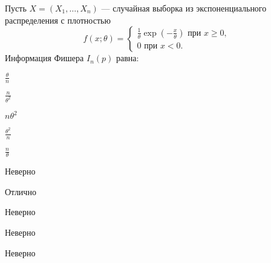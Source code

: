 
\begin{question}
Пусть \(X = (X_1, \ldots , X_n)\) — случайная выборка из
экспоненциального распределения с плотностью \[
f(x; \theta) =
\begin{cases}
\frac{1}{\theta}\exp(-\frac{x}{\theta}) \text{ при } x \geq 0,  \\
0 \text{ при } x < 0.
\end{cases}
\] Информация Фишера \(I_n(p)\) равна:
\begin{answerlist}
  \item \(\frac{\theta}{n}\)
  \item \(\frac{n}{\theta^2}\)
  \item \(n \theta^2\)
  \item \(\frac{\theta^2}{n}\)
  \item \(\frac{n}{\theta}\)
\end{answerlist}
\end{question}

\begin{solution}
\begin{answerlist}
  \item Неверно
  \item Отлично
  \item Неверно
  \item Неверно
  \item Неверно
\end{answerlist}
\end{solution}

